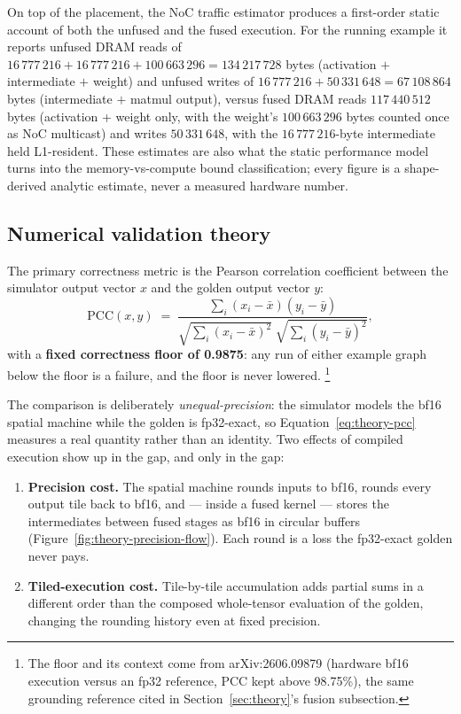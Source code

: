 On top of the placement, the NoC traffic estimator produces a first-order static
account of both the unfused and the fused execution. For the running example it
reports unfused DRAM reads of
$16\,777\,216 + 16\,777\,216 + 100\,663\,296 = 134\,217\,728$ bytes
(activation $+$ intermediate $+$ weight) and unfused writes of
$16\,777\,216 + 50\,331\,648 = 67\,108\,864$ bytes (intermediate $+$ matmul
output), versus fused DRAM
reads $117\,440\,512$ bytes (activation + weight only, with the weight's
$100\,663\,296$ bytes counted once as NoC multicast) and writes $50\,331\,648$,
with the $16\,777\,216$-byte intermediate held L1-resident. These estimates are
also what the static performance model turns into the memory-vs-compute bound
classification; every figure is a shape-derived analytic estimate, never a measured
hardware number.

\subsection{Numerical validation theory}

The primary correctness metric is the Pearson correlation coefficient between the
simulator output vector $x$ and the golden output vector $y$:
\begin{equation}
  \mathrm{PCC}(x, y) \;=\;
  \frac{\sum_i (x_i - \bar{x})(y_i - \bar{y})}
       {\sqrt{\sum_i (x_i - \bar{x})^2}\;\sqrt{\sum_i (y_i - \bar{y})^2}},
  \label{eq:theory-pcc}
\end{equation}
with a \textbf{fixed correctness floor of 0.9875}: any run of either example graph
below the floor is a failure, and the floor is never lowered.%
\footnote{The floor and its context come from arXiv:2606.09879 (hardware bf16
  execution versus an fp32 reference, PCC kept above 98.75\%), the same grounding
  reference cited in Section~\ref{sec:theory}'s fusion subsection.}

The comparison is deliberately \emph{unequal-precision}: the simulator models the
bf16 spatial machine while the golden is fp32-exact, so Equation~\eqref{eq:theory-pcc}
measures a real quantity rather than an identity. Two effects of compiled execution
show up in the gap, and only in the gap:

\begin{enumerate}[nosep]
  \item \textbf{Precision cost.} The spatial machine rounds inputs to bf16, rounds
        every output tile back to bf16, and --- inside a fused kernel --- stores the
        intermediates between fused stages as bf16 in circular buffers
        (Figure~\ref{fig:theory-precision-flow}). Each round is a loss the
        fp32-exact golden never pays.
  \item \textbf{Tiled-execution cost.} Tile-by-tile accumulation adds partial sums
        in a different order than the composed whole-tensor evaluation of the
        golden, changing the rounding history even at fixed precision.
\end{enumerate}

